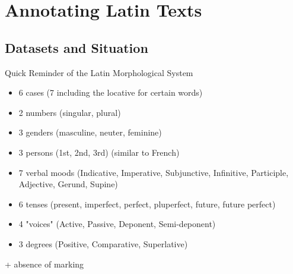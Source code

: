 \documentclass[aspectratio=169]{beamer}
\begin{document}
\section{Annotating Latin Texts}

\subsection{Datasets and Situation}

\begin{frame}{Quick Reminder of the Latin Morphological System}

\begin{itemize}
    \item 6 cases (7 including the locative for certain words)
    \item 2 numbers (singular, plural)
    \item 3 genders (masculine, neuter, feminine)
    \item 3 persons (1st, 2nd, 3rd) (similar to French)
    \item 7 verbal moods (Indicative, Imperative, Subjunctive, Infinitive, Participle, Adjective, Gerund, Supine)
    \item 6 tenses (present, imperfect, perfect, pluperfect, future, future perfect)
    \item 4 "voices" (Active, Passive, Deponent, Semi-deponent)
    \item 3 degrees (Positive, Comparative, Superlative)
\end{itemize}

+ absence of marking
    
\end{frame}
\end{document}
